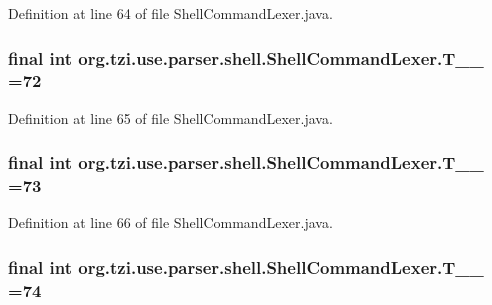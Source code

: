 Definition at line 64 of file Shell\-Command\-Lexer.\-java.

\hypertarget{classorg_1_1tzi_1_1use_1_1parser_1_1shell_1_1_shell_command_lexer_a414fcef2e9a647ab5bb74e8a8a4e14c1}{
\subsubsection[{T\-\_\-\-\_\-72}]{\setlength{\rightskip}{0pt plus 5cm}final int org.\-tzi.\-use.\-parser.\-shell.\-Shell\-Command\-Lexer.\-T\-\_\-\-\_ =72\hspace{0.3cm}{\ttfamily [static]}}}\label{classorg_1_1tzi_1_1use_1_1parser_1_1shell_1_1_shell_command_lexer_a414fcef2e9a647ab5bb74e8a8a4e14c1}


Definition at line 65 of file Shell\-Command\-Lexer.\-java.

\hypertarget{classorg_1_1tzi_1_1use_1_1parser_1_1shell_1_1_shell_command_lexer_a395fa88a1c807286d03752dff08b190f}{
\subsubsection[{T\-\_\-\-\_\-73}]{\setlength{\rightskip}{0pt plus 5cm}final int org.\-tzi.\-use.\-parser.\-shell.\-Shell\-Command\-Lexer.\-T\-\_\-\-\_ =73\hspace{0.3cm}{\ttfamily [static]}}}\label{classorg_1_1tzi_1_1use_1_1parser_1_1shell_1_1_shell_command_lexer_a395fa88a1c807286d03752dff08b190f}


Definition at line 66 of file Shell\-Command\-Lexer.\-java.

\hypertarget{classorg_1_1tzi_1_1use_1_1parser_1_1shell_1_1_shell_command_lexer_ad15f9fabc53abab89360b9224c162240}{
\subsubsection[{T\-\_\-\-\_\-74}]{\setlength{\rightskip}{0pt plus 5cm}final int org.\-tzi.\-use.\-parser.\-shell.\-Shell\-Command\-Lexer.\-T\-\_\-\-\_ =74\hspace{0.3cm}{\ttfamily [static]}}}\label{classorg_1_1tzi_1_1use_1_1parser_1_1shell_1_1_shell_command_lexer_ad15f9fabc53abab89360b9224c162240}


